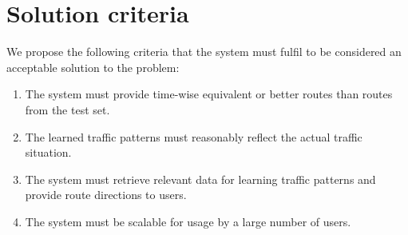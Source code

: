\section{Solution criteria}\label{chap:solutioncriteria}
We propose the following criteria that the system must fulfil to be considered an acceptable solution to the problem:

\begin{enumerate}
	\item The system must provide time-wise equivalent or better routes than routes from the test set.\label{crit:timesaving}
	\item The learned traffic patterns must reasonably reflect the actual traffic situation.\label{crit:cost}
	\item The system must retrieve relevant data for learning traffic patterns and provide route directions to users.\label{crit:sendmessages}
	\item The system must be scalable for usage by a large number of users. \label{crit:severalconnections}
\end{enumerate}




